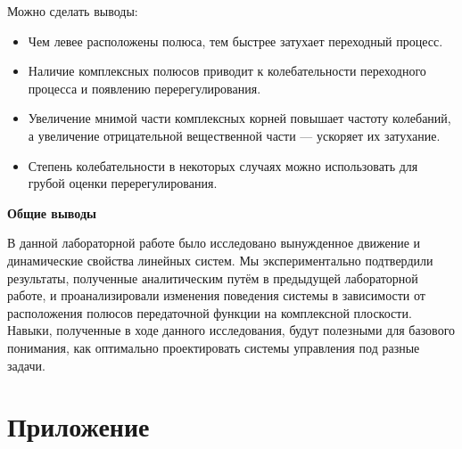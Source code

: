 Можно сделать выводы:
\begin{itemize}
    \item Чем левее расположены полюса, тем быстрее затухает переходный процесс.
    \item Наличие комплексных полюсов приводит к колебательности переходного процесса и появлению перерегулирования.
    \item Увеличение мнимой части комплексных корней повышает частоту колебаний, а увеличение отрицательной вещественной части — ускоряет их затухание.
    \item Степень колебательности в некоторых случаях можно использовать для грубой оценки перерегулирования.
\end{itemize}


\textbf{Общие выводы}

В данной лабораторной работе было исследовано вынужденное движение и динамические свойства линейных систем. Мы экспериментально подтвердили
результаты, полученные аналитическим путём в предыдущей лабораторной работе, и проанализировали изменения поведения системы
в зависимости от расположения полюсов передаточной функции на комплексной плоскости. Навыки, полученные в ходе данного исследования,
будут полезными для базового понимания, как оптимально проектировать системы управления под разные задачи.

\newpage
\section{Приложение}

